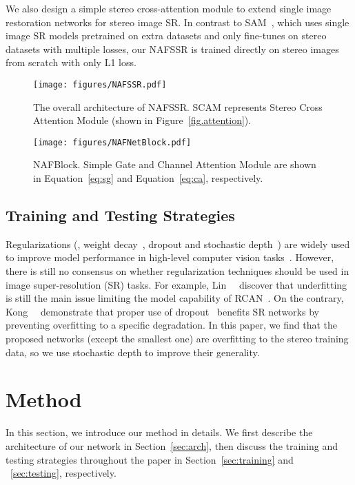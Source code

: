\documentclass[10pt,twocolumn,letterpaper]{article}
\begin{document}
We also design a simple stereo cross-attention module to extend single image restoration networks for stereo image SR.
In contrast to SAM~\cite{ying2020stereo}, which uses single image SR models pretrained on extra datasets and only fine-tunes on stereo datasets with multiple losses, our NAFSSR is trained directly on stereo images from scratch with only L1 loss.


\begin{figure*}[t]
\centering
\texttt{[image: figures/NAFSSR.pdf]}
\vspace{-2mm}
\caption{The overall architecture of NAFSSR.
SCAM represents Stereo Cross Attention Module (shown in Figure~\ref{fig.attention}).
}
\vspace{-2mm}
\label{fig.overall}
\end{figure*}

\begin{figure}[t]
\centering
\texttt{[image: figures/NAFNetBlock.pdf]}
\vspace{-2mm}
\caption{NAFBlock. Simple Gate and Channel Attention Module are shown in Equation~\ref{eq:sg} and Equation~\ref{eq:ca}, respectively. }
\label{fig.block}
\vspace{-2mm}
\end{figure}


\subsection{Training and Testing Strategies}
Regularizations (\eg, weight decay~\cite{wightman2021resnet}, dropout and stochastic depth~\cite{huang2016deep}) are widely used to improve model performance in high-level computer vision tasks~\cite{wightman2021resnet}.
However, there is still no consensus on whether regularization techniques should be used in image super-resolution (SR) tasks. For example, Lin~\etal~\cite{lin2022revisiting} discover that underfitting is still the main issue limiting the model capability of RCAN~\cite{zhang2018image}. On the contrary, Kong~\etal~\cite{kong2021reflash} demonstrate that proper use of dropout~\cite{hinton2012improving} benefits SR networks by preventing overfitting to a specific degradation.
In this paper, we find that the proposed networks (except the smallest one) are overfitting to the stereo training data, so we use stochastic depth to improve their generality.
 
\section{Method}
In this section, we introduce our method in details.
We first describe the architecture of our network in Section~\ref{sec:arch}, then discuss the training and testing strategies throughout the paper in Section~\ref{sec:training} and ~\ref{sec:testing}, respectively.
\end{document}
